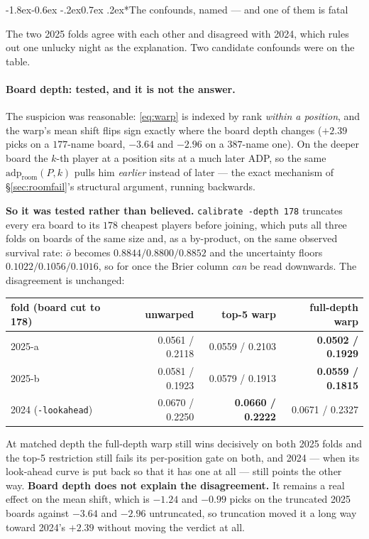 \documentclass[10pt,a4paper]{article}
\makeatletter
\theoremstyle{plain}
\theoremstyle{definition}
\theoremstyle{remark}
\newcommand{\code}[1]{\texttt{\small #1}}
\newcommand{\adp}{\mathrm{adp}}
\renewcommand\subsubsection{\@startsection{subsubsection}{3}{\z@}%
  {-1.8ex\@plus -0.6ex \@minus -.2ex}{0.7ex \@plus .2ex}{\normalfont\normalsize\bfseries}}
\makeatother
\begin{document}
\subsubsection*{The confounds, named --- and one of them is fatal}

The two 2025 folds agree with each other and disagreed with 2024, which rules out one
unlucky night as the explanation. Two candidate confounds were on the table.

\paragraph{Board depth: tested, and it is not the answer.} The suspicion was reasonable:
\eqref{eq:warp} is indexed by rank \emph{within a position}, and the warp's mean shift
flips sign exactly where the board depth changes ($+2.39$ picks on a $177$-name board,
$-3.64$ and $-2.96$ on a $387$-name one). On the deeper board the $k$-th player at a
position sits at a much later ADP, so the same $\adp_{\text{room}}(P,k)$ pulls him
\emph{earlier} instead of later --- the exact mechanism of \S\ref{sec:roomfail}'s
structural argument, running backwards.

\textbf{So it was tested rather than believed.} \code{calibrate -depth 178} truncates
every era board to its $178$ cheapest players before joining, which puts all three folds
on boards of the same size and, as a by-product, on the same observed survival rate:
$\bar o$ becomes $0.8844 / 0.8800 / 0.8852$ and the uncertainty floors $0.1022 / 0.1056 /
0.1016$, so for once the Brier column \emph{can} be read downwards. The disagreement is
unchanged:

\begin{center}
\small
\begin{tabular}{lrrr}
\toprule
fold (board cut to 178) & unwarped & top-5 warp & full-depth warp \\
\midrule
2025-a & 0.0561 / 0.2118 & 0.0559 / 0.2103 & \textbf{0.0502 / 0.1929} \\
2025-b & 0.0581 / 0.1923 & 0.0579 / 0.1913 & \textbf{0.0559 / 0.1815} \\
\midrule
2024 (\code{-lookahead}) & 0.0670 / 0.2250 & \textbf{0.0660 / 0.2222} & 0.0671 / 0.2327 \\
\bottomrule
\end{tabular}
\end{center}

At matched depth the full-depth warp still wins decisively on both 2025 folds and the
top-5 restriction still fails its per-position gate on both, and 2024 --- when its
look-ahead curve is put back so that it has one at all --- still points the other way.
\textbf{Board depth does not explain the disagreement.} It remains a real effect on the
mean shift, which is $-1.24$ and $-0.99$ picks on the truncated 2025 boards against
$-3.64$ and $-2.96$ untruncated, so truncation moved it a long way toward 2024's $+2.39$
without moving the verdict at all.
\end{document}
